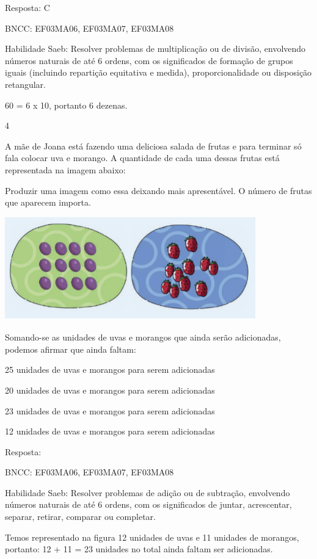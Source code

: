 \begin{escolha}
Resposta: C

BNCC: EF03MA06, EF03MA07, EF03MA08

Habilidade Saeb: Resolver problemas de multiplicação ou de divisão,
envolvendo números naturais de até 6 ordens, com os significados de
formação de grupos iguais (incluindo repartição equitativa e medida),
proporcionalidade ou disposição retangular.

60 = 6 x 10, portanto 6 dezenas.

\num{4}

A mãe de Joana está fazendo uma deliciosa salada de frutas e para
terminar só fala colocar uva e morango. A quantidade de cada uma dessas
frutas está representada na imagem abaixo:

Produzir uma imagem como essa deixando mais apresentável. O número de
frutas que aparecem importa.

\includegraphics[width=4.26704in,height=1.75849in]{media/image132.png}

Somando-se as unidades de uvas e morangos que ainda serão adicionadas,
podemos afirmar que ainda faltam:

\begin{escolha}

\item
  25 unidades de uvas e morangos para serem adicionadas
\item
  20 unidades de uvas e morangos para serem adicionadas
\item
  23 unidades de uvas e morangos para serem adicionadas
\item
  12 unidades de uvas e morangos para serem adicionadas
\end{escolha}

Resposta:

BNCC: EF03MA06, EF03MA07, EF03MA08

Habilidade Saeb: Resolver problemas de adição ou de subtração,
envolvendo números naturais de até 6 ordens, com os significados de
juntar, acrescentar, separar, retirar, comparar ou completar.

Temos representado na figura 12 unidades de uvas e 11 unidades de
morangos, portanto: 12 + 11 = 23 unidades no total ainda faltam ser
adicionadas.


\end{escolha}
